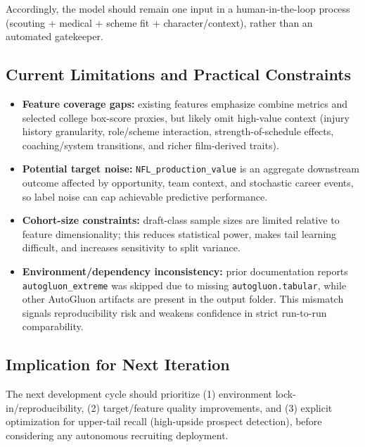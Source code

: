 Accordingly, the model should remain one input in a human-in-the-loop process (scouting + medical + scheme fit + character/context), rather than an automated gatekeeper.

\subsection{Current Limitations and Practical Constraints}

\begin{itemize}
    \item \textbf{Feature coverage gaps:} existing features emphasize combine metrics and selected college box-score proxies, but likely omit high-value context (injury history granularity, role/scheme interaction, strength-of-schedule effects, coaching/system transitions, and richer film-derived traits).
    \item \textbf{Potential target noise:} \texttt{NFL\_production\_value} is an aggregate downstream outcome affected by opportunity, team context, and stochastic career events, so label noise can cap achievable predictive performance.
    \item \textbf{Cohort-size constraints:} draft-class sample sizes are limited relative to feature dimensionality; this reduces statistical power, makes tail learning difficult, and increases sensitivity to split variance.
    \item \textbf{Environment/dependency inconsistency:} prior documentation reports \texttt{autogluon\_extreme} was skipped due to missing \texttt{autogluon.tabular}, while other AutoGluon artifacts are present in the output folder. This mismatch signals reproducibility risk and weakens confidence in strict run-to-run comparability.
\end{itemize}

\subsection{Implication for Next Iteration}

The next development cycle should prioritize (1) environment lock-in/reproducibility, (2) target/feature quality improvements, and (3) explicit optimization for upper-tail recall (high-upside prospect detection), before considering any autonomous recruiting deployment.
